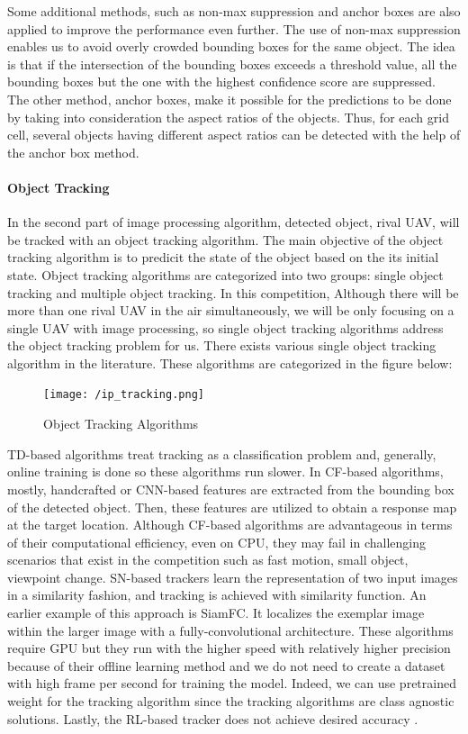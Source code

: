 \documentclass[12pt]{article}
\begin{document}
\FloatBarrier
\justify Some additional methods, such as non-max suppression and anchor boxes are also applied to improve the performance even further. The use of non-max suppression enables us to avoid overly crowded bounding boxes for the same object. The idea is that if the intersection of the bounding boxes exceeds a threshold value, all the bounding boxes but the one with the highest confidence score are suppressed. The other method, anchor boxes, make it possible for the predictions to be done by taking into consideration the aspect ratios of the objects. Thus, for each grid cell, several objects having different aspect ratios can be detected with the help of the anchor box method.


\paragraph{Object Tracking}
\justify In the second part of image processing algorithm, detected object, rival UAV, will be tracked with an object tracking algorithm. The main objective of the object tracking algorithm is to predicit the state of the object based on the its initial state. Object tracking algorithms are categorized into two groups: single object tracking and multiple object tracking. In this competition, Although there will be  more than one rival UAV in the air simultaneously, we will be only focusing on a single UAV with image processing, so single object tracking algorithms address the object tracking problem for us. There exists various single object tracking algorithm in the literature.  These algorithms are categorized in the figure below:
\begin{figure}[ht]
 	\centering
 	\texttt{[image: /ip\_tracking.png]}
 	\caption{Object Tracking Algorithms\cite{s20020547}}
        \label{fig:moment}
 \end{figure}
\FloatBarrier
\justify TD-based algorithms treat tracking as a classification problem and, generally, online training is done so these algorithms run slower. In CF-based algorithms, mostly,  handcrafted or CNN-based features are extracted from the bounding box of the detected object. Then, these features are utilized to obtain a response map at the target location. Although CF-based algorithms  are advantageous in terms of their computational efficiency, even on CPU, they may fail in challenging scenarios that exist in the competition such as fast motion, small object, viewpoint change. SN-based trackers learn the representation of two input images in a similarity fashion, and tracking is achieved with similarity function. An earlier example of this approach is SiamFC. It localizes the exemplar image within the larger image with a fully-convolutional architecture\cite{bertinetto2016fully}. These algorithms require GPU but they run with the higher speed with relatively higher precision because of their offline learning method and we do not need to create a dataset with high frame per second for training the model. Indeed, we can use pretrained weight for the tracking algorithm since the tracking algorithms are class agnostic solutions. Lastly, the RL-based tracker does not achieve desired accuracy \cite{isaac2021unmanned}. 
\end{document}
